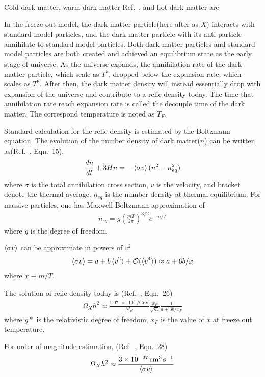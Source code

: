 Cold dark matter, warm dark matter Ref.~\cite{Peacock2003}, and hot dark matter are 

In the freeze-out model, the dark matter particle(here after as $X$) interacts with standard model particles, and the dark matter particle with its anti particle annihilate to standard model particles. Both dark matter particles and standard model particles are both created and achieved an equilibrium state as the early stage of universe. As the universe expands, the annihilation rate of the dark matter particle, which scale as $T^5$, dropped below the expansion rate, which scales as $T^2$. After then, the dark matter density will instead essentially drop with expansion of the universe and contribute to a relic density today. The time that annihilation rate reach expansion rate is called the decouple time of the dark matter. The correspond temperature is noted as $T_F$. 

Standard calculation for the relic density is estimated by the Boltzmann equation. The evolution of the number density of dark matter($n$) can be written as(Ref.~\cite{Bertone2005}, Eqn.~15),
\begin{align}
\frac{dn}{dt} + 3 H n = -\braket{\sigma v}(n^2-n_{eq}^2)
\end{align}
where $\sigma$ is the total annihilation cross section, $v$ is the velocity, and bracket denote the thermal average. $n_{eq}$ is the number density at thermal equilibrium. For massive particles, one has Maxwell-Boltzmann approximation of
\begin{align}
n_{eq}= g (\frac{mT}{2 \pi})^{3/2} e^{-m/T}
\end{align}
where $g$ is the degree of freedom.

$\braket{\sigma v}$ can be approximate in powers of $v^2$
\begin{align}
\braket{\sigma v} = a+b \braket{v^2} +\mathcal{O}(\braket{v^4}) \approx a+6b/x
\end{align}
where $x \equiv m/T$.

The solution of relic density today is (Ref.~\cite{Bertone2005}, Eqn.~26)
\begin{align}
\Omega_X h^2 \approx \frac{\SI{1.07e9}{\per\GeV}}{M_{pl}}\frac{x_F}{\sqrt{g_*}}\frac{1}{a+3b/x_F}
\end{align}
where $g*$ is the relativistic degree of freedom, $x_F$ is the value of $x$ at freeze out temperature.

For order of magnitude estimation, (Ref.~\cite{Bertone2005}, Eqn.~28)
\begin{align}
\Omega_X h^2 \approx \frac{\SI{3e-27}{\cm\cubed\per\second} }{\braket{\sigma v}}
\end{align}

